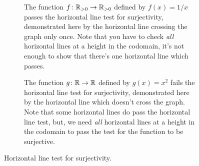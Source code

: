 \documentclass[fleqn]{LectureClass/LectureClass}
\begin{document}
    \begin{figure}
        \centering
        \begin{subfigure}{0.9 \textwidth}
            \centering
            \tikzexternaldisable
            \caption[\(y = 1/x\) passes the surjective horizontal line test.]{The function \(f \colon \mathbb{R}_{>0} \to \mathbb{R}_{>0}\) defined by \(f(x) = 1/x\) passes the horizontal line test for surjectivity, demonstrated here by the horizontal line crossing the graph only once. Note that you have to check \emph{all} horizontal lines at a height in the codomain, it's not enough to show that there's one horizontal line which passes.}
            \label{fig:1 over x surjective}
        \end{subfigure}
        
        \begin{subfigure}{0.9\textwidth}
            \centering
            \caption[\(y = x^2\) fails the surjective horizontal line test.]{The function \(g \colon \mathbb{R} \to \mathbb{R}\) defined by \(g(x) = x^2\) fails the horizontal line test for surjectivity, demonstrated here by the horizontal line which doesn't cross the graph. Note that some horizontal lines do pass the horizontal line test, but, we need \emph{all} horizontal lines at a height in the codomain to pass the test for the function to be surjective.}
            \label{fig:x squared not surjective}
        \end{subfigure}
        \caption{Horizontal line test for surjectivity.}
    \end{figure}
    
\end{document}
